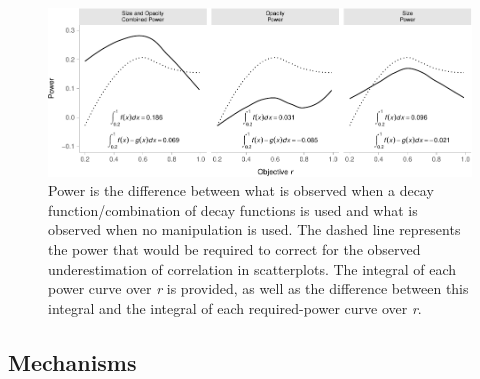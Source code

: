 \documentclass[sigconf]{acmart}
\begin{document}
\begin{figure}

{\centering \includegraphics[width=1\textwidth,height=\textheight]{size_and_opacity_files/figure-pdf/fig-power-plot-1.pdf}

}

\caption{\label{fig-power-plot}Power is the difference between what is
observed when a decay function/combination of decay functions is used
and what is observed when no manipulation is used. The dashed line
represents the power that would be required to correct for the observed
underestimation of correlation in scatterplots. The integral of each
power curve over \textit{r} is provided, as well as the difference
between this integral and the integral of each required-power curve over
\textit{r}.}

\end{figure}

\hypertarget{sec-mechs}{%
\subsection{Mechanisms}\label{sec-mechs}}
\end{document}
